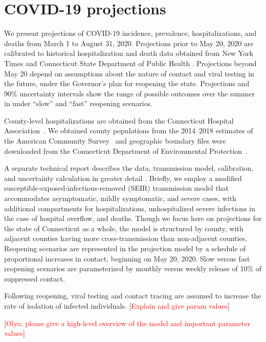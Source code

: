 \documentclass[11pt]{article}
\newcommand{\comment}[1]{[\textcolor{red}{#1}]}
\begin{document}

\section*{COVID-19 projections} 

We present projections of COVID-19 incidence, prevalence, hospitalizations, and deaths from March 1 to August 31, 2020.  Projections prior to May 20, 2020 are calibrated to historical hospitalization and death data obtained from New York Times \citep{nyt2020Connecticut} and Connecticut State Department of Public Health \citep{DPHwebsite}. Projections beyond May 20 depend on assumptions about the nature of contact and viral testing in the future, under the Governor's plan for reopening the state.  Projections and 90\% uncertainty intervals show the range of possible outcomes over the summer in under ``slow'' and ``fast'' reopening scenarios.  


County-level hospitalizations are obtained from the Connecticut Hospital Association~\citep{CHAwebsite}. We obtained county populations from the 2014--2018 estimates of the American Community Survey~\citep{acs2018} and geographic boundary files were downloaded from the Connecticut Department of Environmental Protection~\citep{shapefile}. 

A separate technical report describes the data, transmission model, calibration, and uncertainty calculation in greater detail \citep{morozova2020tech}.  Briefly, we employ a modified susceptible-exposed-infectious-removed (SEIR) transmission model that accommodates asymptomatic, mildly symptomatic, and severe cases, with additional compartments for hospitalizations, unhospitalized severe infections in the case of hospital overflow, and deaths. Though we focus here on projections for the state of Connecticut as a whole, the model is structured by county, with adjacent counties having more cross-transmission than non-adjacent counties.  Reopening scenarios are represented in the projection model by a schedule of proportional increases in contact, beginning on May 20, 2020. Slow versus fast reopening scenarios are parameterized by monthly versus weekly release of 10\% of suppressed contact. 

Following reopening, viral testing and contact tracing are assumed to increase the rate of isolation of infected individuals.  \comment{Explain and give param values}

\comment{Olya: please give a high-level overview of the model and important parameter values}
\end{document}
